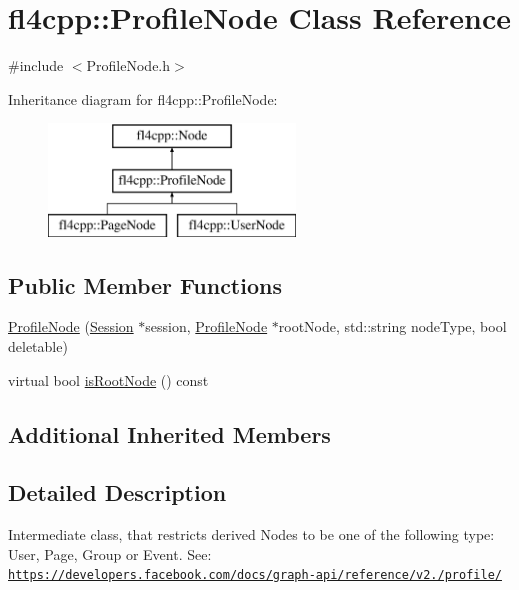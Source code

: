 \hypertarget{classfl4cpp_1_1_profile_node}{}\section{fl4cpp\+:\+:Profile\+Node Class Reference}
\label{classfl4cpp_1_1_profile_node}


{\ttfamily \#include $<$Profile\+Node.\+h$>$}

Inheritance diagram for fl4cpp\+:\+:Profile\+Node\+:\begin{figure}[H]
\begin{center}
\leavevmode
\includegraphics[height=3.000000cm]{classfl4cpp_1_1_profile_node}
\end{center}
\end{figure}
\subsection*{Public Member Functions}
\begin{DoxyCompactItemize}
\item 
\hyperlink{classfl4cpp_1_1_profile_node_aed054a3dbc41db4a22a67af9c87da778}{Profile\+Node} (\hyperlink{classfl4cpp_1_1_session}{Session} $\ast$session, \hyperlink{classfl4cpp_1_1_profile_node}{Profile\+Node} $\ast$root\+Node, std\+::string node\+Type, bool deletable)
\item 
virtual bool \hyperlink{classfl4cpp_1_1_profile_node_a7ea2fc3e1cb5054df96842737cb3d20a}{is\+Root\+Node} () const 
\end{DoxyCompactItemize}
\subsection*{Additional Inherited Members}


\subsection{Detailed Description}
Intermediate class, that restricts derived Nodes to be one of the following type\+: User, Page, Group or Event. See\+: \href{https://developers.facebook.com/docs/graph-api/reference/v2.0/profile/}{\tt https\+://developers.\+facebook.\+com/docs/graph-\/api/reference/v2./profile/} 

